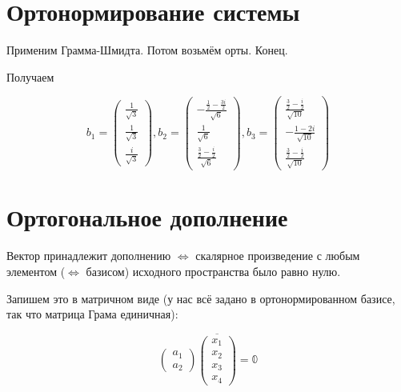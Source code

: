 \documentclass[12pt, a4paper]{article}
\begin{document}
    \section{Ортонормирование системы}

    Применим Грамма-Шмидта. Потом возьмём орты. Конец.

    Получаем

    \begin{equation}
        b_1 = \begin{pmatrix}
            \frac{1}{\sqrt{3}} \\ \frac{1}{\sqrt{3}} \\ \frac{i}{\sqrt{3}}
        \end{pmatrix},
        b_2 = \begin{pmatrix}
            -\frac{\frac 12  - \frac{3i}{2}}{\sqrt{6}} \\ \frac{1}{\sqrt{6}} \\ \frac{\frac 32 - \frac{i}{2}}{\sqrt{6}}
        \end{pmatrix},
        b_3 = \begin{pmatrix}
            \frac{\frac 32  - \frac{i}{2}}{\sqrt{10}} \\ -\frac{1 - 2i}{\sqrt{10}} \\ \frac{\frac 32 - \frac{i}{2}}{\sqrt{10}}
        \end{pmatrix}        
    \end{equation}

    \section{Ортогональное дополнение}

    Вектор принадлежит дополнению $\Longleftrightarrow$ скалярное произведение с любым элементом 
    ($\Longleftrightarrow$ базисом) исходного пространства было равно нулю.

    Запишем это в матричном виде (у нас всё задано в ортонормированном базисе, так что матрица Грама единичная):

    \begin{equation}
        \begin{pmatrix}
            a_1 \\ a_2
        \end{pmatrix} \overline{\begin{pmatrix}
            x_1 \\ x_2 \\ x_3 \\ x_4
        \end{pmatrix}} = \mathbb{0}
    \end{equation}
\end{document}
